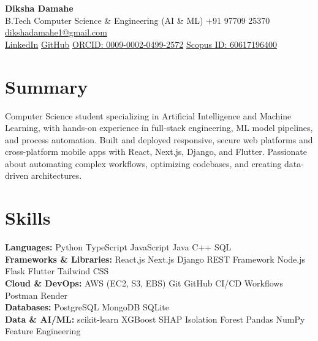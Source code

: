 \documentclass[10pt,a4paper]{article}
\begin{document}
\begin{center}
  {\LARGE\bfseries Diksha Damahe}\\[4pt]
  \small
  B.Tech Computer Science \& Engineering (AI \& ML) \textbar{} +91 97709 25370 \textbar{} \href{mailto:dikshadamahe1@gmail.com}{dikshadamahe1@gmail.com} \\
  \href{https://www.linkedin.com/in/dikshadamahe}{LinkedIn} \textbar{}
  \href{https://github.com/dikshadamahe}{GitHub} \textbar{}
  \href{https://orcid.org/0009-0002-0499-2572}{ORCID: 0009-0002-0499-2572} \textbar{}
  \href{https://www.scopus.com/authid/detail.uri?authorId=60617196400}{Scopus ID: 60617196400}
\end{center}

\vspace{-4pt}

\section{Summary}
Computer Science student specializing in Artificial Intelligence and Machine Learning, with hands-on experience in full-stack engineering, ML model pipelines, and process automation. Built and deployed responsive, secure web platforms and cross-platform mobile apps with React, Next.js, Django, and Flutter. Passionate about automating complex workflows, optimizing codebases, and creating data-driven architectures.

\section{Skills}
\textbf{Languages:} Python \textperiodcentered{} TypeScript \textperiodcentered{} JavaScript \textperiodcentered{} Java \textperiodcentered{} C++ \textperiodcentered{} SQL\\[2pt]
\textbf{Frameworks \& Libraries:} React.js \textperiodcentered{} Next.js \textperiodcentered{} Django REST Framework \textperiodcentered{} Node.js \textperiodcentered{} Flask \textperiodcentered{} Flutter \textperiodcentered{} Tailwind CSS\\[2pt]
\textbf{Cloud \& DevOps:} AWS (EC2, S3, EBS) \textperiodcentered{} Git \textperiodcentered{} GitHub \textperiodcentered{} CI/CD Workflows \textperiodcentered{} Postman \textperiodcentered{} Render\\[2pt]
\textbf{Databases:} PostgreSQL \textperiodcentered{} MongoDB \textperiodcentered{} SQLite\\[2pt]
\textbf{Data \& AI/ML:} scikit-learn \textperiodcentered{} XGBoost \textperiodcentered{} SHAP \textperiodcentered{} Isolation Forest \textperiodcentered{} Pandas \textperiodcentered{} NumPy \textperiodcentered{} Feature Engineering
\end{document}

